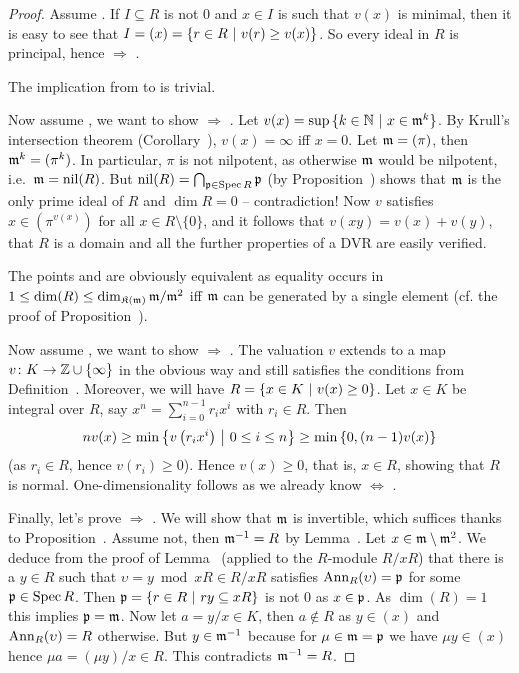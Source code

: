 \documentclass[a4paper,parskip=half,numbers=enddot, DIV=12, headheight=30pt]{scrreprt}
\begin{document}
\begin{proof}
    Assume . If $I\subseteq R$ is not $0$ and $x\in I$ is such that $v(x)$ is minimal, then it is easy to see that $I = (x) = \left\{r\in R\ \middle|\  v(r) \geq v(x)\right\}$. So every ideal in $R$ is principal, hence  $\Rightarrow$ .
    
    The implication from  to  is trivial.
    
    Now assume , we want to show  $\Rightarrow$ . Let $v(x) = \sup\left\{k\in \mathbb{N} \ \middle|\  x\in \smash{\mathfrak{m}^k}\right\}$. By Krull's intersection theorem (Corollary~), $v(x) = \infty$ iff $x=0$. Let $\mathfrak{m} = (\pi)$, then $\mathfrak{m}^k = (\pi^k)$. In particular, $\pi$ is not nilpotent, as otherwise $\mathfrak{m}$ would be nilpotent, i.e.\ $\mathfrak{m}=\operatorname{nil}(R)$. But $\operatorname{nil}(R)=\bigcap_{\mathfrak{p}\in\operatorname{Spec} R}\mathfrak{p}$ (by Proposition~) shows that $\mathfrak{m}$ is the only prime ideal of $R$ and $\dim R = 0$ -- contradiction! Now $v$ satisfies $x\in (\pi^{v(x)})$ for all $x\in R\setminus\{0\}$, and it follows that $v(xy) = v(x) + v(y)$, that $R$ is a domain and all the further properties of a DVR are easily verified.
    
    The points  and  are obviously equivalent as equality occurs in $1\leq\dim(R)\leq\dim_{\mathfrak{K}(\mathfrak{m})}\mathfrak{m}/\mathfrak{m}^2$ iff $\mathfrak{m}$ can be generated by a single element (cf. the proof of Proposition~).
    
    Now assume , we want to show  $\Rightarrow$ . The valuation $v$ extends to a map $v\colon K\morphism\IZ\cup\{\infty\}$ in the obvious way and still satisfies the conditions from Definition~. Moreover, we will have $R=\left\{x\in K\ \middle|\  v(x)\geq 0\right\}$. Let $x\in K$ be integral over $R$, say $x^n = \sum_{i=0}^{n-1} r_i x^i$ with $r_i \in R$. Then 
    \begin{align*}
    	nv(x) \geq \min \left \{v\left(r_ix^i\right)\ \middle|\  0\leq i\leq n\right\} \geq \min\left\{ 0, (n-1)v(x)\right\}
    \end{align*}
     (as $r_i\in R$, hence $v(r_i)\geq 0$). Hence $v(x)\geq 0$, that is, $x\in R$, showing that $R$ is normal. One-dimensionality follows as we already know  $\Leftrightarrow$ .
    
    Finally, let's prove  $\Rightarrow$ . We will show that $\mathfrak{m}$ is invertible, which suffices thanks to Proposition~. Assume not, then $\mathfrak{m}^{-1}=R$ by Lemma~. Let $x\in \mathfrak{m}\setminus \mathfrak{m}^2$. We deduce from the proof of Lemma~ (applied to the $R$-module $R/xR$) that there is a $y\in R$ such that $\upsilon = y\bmod xR\in R/xR$ satisfies $\operatorname{Ann}_R(\upsilon) = \mathfrak{p}$ for some $\mathfrak{p}\in \operatorname{Spec} R$. Then $\mathfrak{p} = \left\{r\in R\ \middle|\  ry\subseteq xR\right\}$ is not 0 as $x\in\mathfrak{p}$. As $\dim(R) = 1$ this implies $\mathfrak{p} = \mathfrak{m}$. Now let $a=y/x\in K$, then $a\not \in R$ as $y\in (x)$ and $\operatorname{Ann}_R(\upsilon)=R$ otherwise. But $y\in \mathfrak{m}^{-1}$ because for $\mu\in\mathfrak{m} = \mathfrak{p}$ we have $\mu y\in (x)$ hence $\mu a = (\mu y)/x\in R$. This contradicts $\mathfrak{m}^{-1}=R$.
\end{proof}
\end{document}
